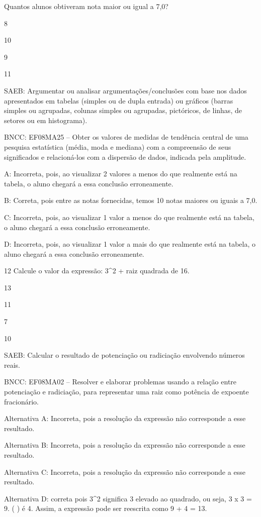 {Quantos alunos obtiveram nota maior ou igual a 7,0?
\item 8
\item 10
\item 9
\item 11

SAEB: Argumentar ou analisar argumentações/conclusões com base nos dados
apresentados em tabelas (simples ou de dupla entrada) ou gráficos
(barras simples ou agrupadas, colunas simples ou agrupadas, pictóricos,
de linhas, de setores ou em histograma).

BNCC: EF08MA25 -- Obter os valores de medidas de tendência central de
uma pesquisa estatística (média, moda e mediana) com a compreensão de
seus significados e relacioná-los com a dispersão de dados, indicada
pela amplitude.

A: Incorreta, pois, ao visualizar 2 valores a menos do que realmente
está na tabela, o aluno chegará a essa conclusão erroneamente.

B: Correta, pois entre as notas fornecidas, temos 10 notas maiores ou
iguais a 7,0.

C: Incorreta, pois, ao visualizar 1 valor a menos do que realmente está
na tabela, o aluno chegará a essa conclusão erroneamente.

D: Incorreta, pois, ao visualizar 1 valor a mais do que realmente está
na tabela, o aluno chegará a essa conclusão erroneamente.

\num{12} Calcule o valor da expressão: 3^2 + raiz quadrada de 16.
\item 13
\item 11
\item 7
\item 10

SAEB: Calcular o resultado de potenciação ou radiciação envolvendo
números reais.

BNCC: EF08MA02 -- Resolver e elaborar problemas usando a relação entre
potenciação e radiciação, para representar uma raiz como potência de
expoente fracionário.

Alternativa A: Incorreta, pois a resolução da expressão não corresponde
a esse resultado.

Alternativa B: Incorreta, pois a resolução da expressão não corresponde
a esse resultado.

Alternativa C: Incorreta, pois a resolução da expressão não corresponde
a esse resultado.

Alternativa D: correta pois 3^2 significa 3 elevado ao quadrado, ou seja,
3 x 3 = 9. ( ) é 4. Assim, a expressão pode ser reescrita como
9 + 4 = 13.

}
